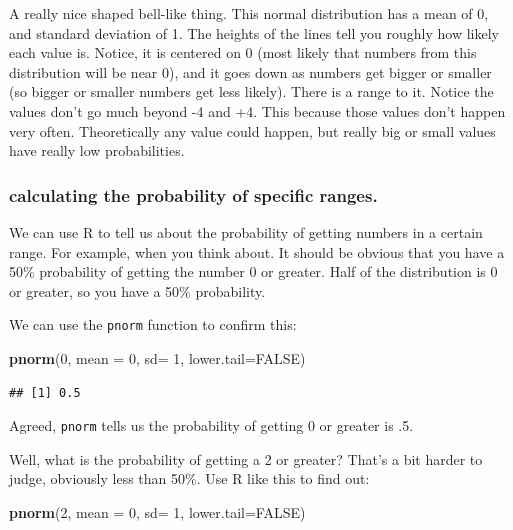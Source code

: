 \documentclass[]{book}
\newenvironment{Shaded}{\begin{snugshade}}{\end{snugshade}}
\newcommand{\KeywordTok}[1]{\textcolor[rgb]{0.13,0.29,0.53}{\textbf{{#1}}}}
\newcommand{\DataTypeTok}[1]{\textcolor[rgb]{0.13,0.29,0.53}{{#1}}}
\newcommand{\DecValTok}[1]{\textcolor[rgb]{0.00,0.00,0.81}{{#1}}}
\newcommand{\OtherTok}[1]{\textcolor[rgb]{0.56,0.35,0.01}{{#1}}}
\newcommand{\NormalTok}[1]{{#1}}
\theoremstyle{definition}
\theoremstyle{definition}
\theoremstyle{definition}
\theoremstyle{remark}
\begin{document}
A really nice shaped bell-like thing. This normal distribution has a
mean of 0, and standard deviation of 1. The heights of the lines tell
you roughly how likely each value is. Notice, it is centered on 0 (most
likely that numbers from this distribution will be near 0), and it goes
down as numbers get bigger or smaller (so bigger or smaller numbers get
less likely). There is a range to it. Notice the values don't go much
beyond -4 and +4. This because those values don't happen very often.
Theoretically any value could happen, but really big or small values
have really low probabilities.

\subsubsection{calculating the probability of specific
ranges.}\label{calculating-the-probability-of-specific-ranges.}

We can use R to tell us about the probability of getting numbers in a
certain range. For example, when you think about. It should be obvious
that you have a 50\% probability of getting the number 0 or greater.
Half of the distribution is 0 or greater, so you have a 50\%
probability.

We can use the \texttt{pnorm} function to confirm this:

\begin{Shaded}
\begin{Highlighting}[]
\KeywordTok{pnorm}\NormalTok{(}\DecValTok{0}\NormalTok{, }\DataTypeTok{mean =} \DecValTok{0}\NormalTok{, }\DataTypeTok{sd=} \DecValTok{1}\NormalTok{, }\DataTypeTok{lower.tail=}\OtherTok{FALSE}\NormalTok{)}
\end{Highlighting}
\end{Shaded}

\begin{verbatim}
## [1] 0.5
\end{verbatim}

Agreed, \texttt{pnorm} tells us the probability of getting 0 or greater
is .5.

Well, what is the probability of getting a 2 or greater? That's a bit
harder to judge, obviously less than 50\%. Use R like this to find out:

\begin{Shaded}
\begin{Highlighting}[]
\KeywordTok{pnorm}\NormalTok{(}\DecValTok{2}\NormalTok{, }\DataTypeTok{mean =} \DecValTok{0}\NormalTok{, }\DataTypeTok{sd=} \DecValTok{1}\NormalTok{, }\DataTypeTok{lower.tail=}\OtherTok{FALSE}\NormalTok{)}
\end{Highlighting}
\end{Shaded}
\end{document}
